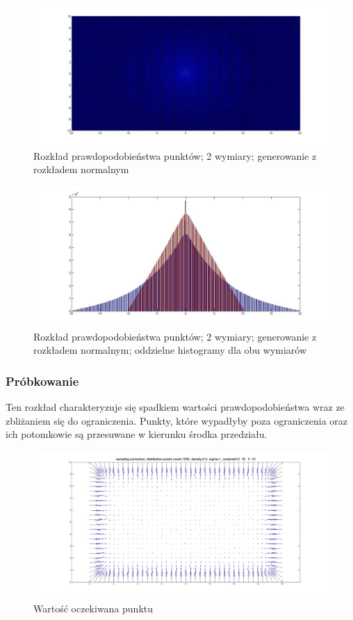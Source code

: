 \documentclass{mini}
\begin{document}
\begin{figure}[H]
\centering
\includegraphics[width=\textwidth]{ri_n_10M_2__20_20__10_10_4}
\caption{Rozkład prawdopodobieństwa punktów; 2 wymiary; generowanie z rozkładem normalnym}
\end{figure}

\begin{figure}[H]
\centering
\includegraphics[width=\textwidth]{ri_n_10M_2__20_20__10_10_4_1D}
\caption{Rozkład prawdopodobieństwa punktów; 2 wymiary; generowanie z rozkładem normalnym; oddzielne histogramy dla obu wymiarów}
\end{figure}

\subsubsection*{Próbkowanie}
Ten rozkład charakteryzuje się spadkiem wartości prawdopodobieństwa wraz ze zbliżaniem się do ograniczenia. Punkty, które wypadłyby poza ograniczenia oraz ich potomkowie są przesuwane w kierunku środka przedziału.

\begin{figure}[H]
\centering
\includegraphics[width=\textwidth]{sampling2dprzesuniecie}
\caption{Wartość oczekiwana punktu}
\end{figure}
\end{document}
